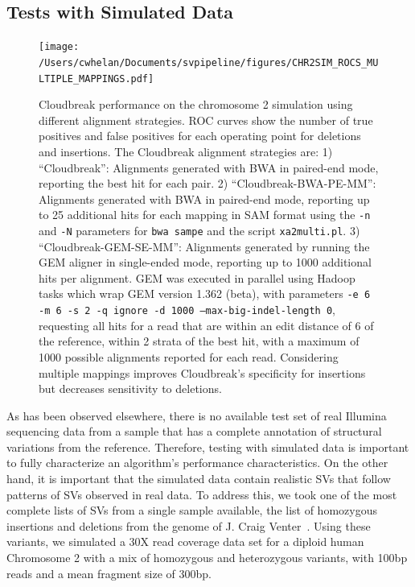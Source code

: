 \documentclass [11pt] {report}
\begin{document}
\subsection{Tests with Simulated Data}

\begin{figure}
\centering
\texttt{[image: /Users/cwhelan/Documents/svpipeline/figures/CHR2SIM\_ROCS\_MULTIPLE\_MAPPINGS.pdf]}
\caption{Cloudbreak performance on the chromosome 2 simulation using different alignment strategies. ROC curves show the number of true positives and false positives for each operating point for deletions and insertions. The Cloudbreak alignment strategies are: 1) ``Cloudbreak'': Alignments generated with BWA in paired-end mode, reporting the best hit for each pair. 2) ``Cloudbreak-BWA-PE-MM'': Alignments generated with BWA in paired-end mode, reporting up to 25 additional hits for each mapping in SAM format using the \texttt{-n} and \texttt{-N} parameters for \texttt{bwa sampe} and the script \texttt{xa2multi.pl}. 3) ``Cloudbreak-GEM-SE-MM'': Alignments generated by running the GEM aligner in single-ended mode, reporting up to 1000 additional hits per alignment. GEM was executed in parallel using Hadoop tasks which wrap GEM version 1.362 (beta), with parameters \texttt{-e 6 -m 6 -s 2 -q ignore -d 1000 --max-big-indel-length 0},  requesting all hits for a read that are within an edit distance of 6 of the reference, within 2 strata of the best hit, with a maximum of 1000 possible alignments reported for each read. Considering multiple mappings improves Cloudbreak's specificity for insertions but decreases sensitivity to deletions.}
\label{alignment_comparison}
\end{figure}


As has been observed elsewhere, there is no available test set of real Illumina sequencing data from a sample that has a complete annotation of structural variations from the reference. Therefore, testing with simulated data is important to fully characterize an algorithm's performance characteristics. On the other hand, it is important that the simulated data contain realistic SVs that follow patterns of SVs observed in real data. To address this, we took one of the most complete lists of SVs from a single sample available, the list of homozygous insertions and deletions from the genome of J. Craig Venter~\cite{Levy:2007fb}. Using these variants, we simulated a 30X read coverage data set for a diploid human Chromosome 2 with a mix of homozygous and heterozygous variants, with 100bp reads and a mean fragment size of 300bp.
\end{document}
